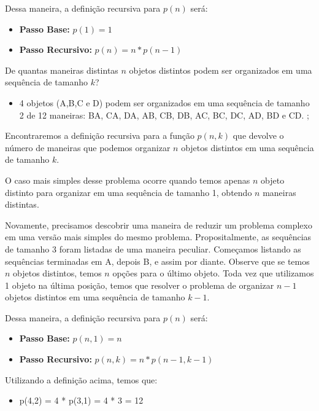 Dessa maneira, a definição recursiva para $p(n)$ será:

\begin{itemize}
    \item \textbf{Passo Base:} $p(1) = 1$
    \item \textbf{Passo Recursivo:} $p(n) = n * p(n-1)$
\end{itemize}


\begin{exemplo}
De quantas maneiras distintas $n$ objetos distintos podem ser organizados em uma sequência de tamanho $k$?


\begin{itemize}
    \item 4 objetos (A,B,C e D) podem ser organizados em uma sequência de tamanho 2 de  12 maneiras: BA, CA, DA, AB, CB, DB, AC, BC, DC, AD, BD e CD. 
    ;
\end{itemize}

\end{exemplo}


Encontraremos a definição recursiva para a função $p(n,k)$ que devolve o número de maneiras que podemos organizar $n$ objetos distintos em uma sequência de tamanho $k$.


O caso mais simples desse problema ocorre quando temos apenas $n$ objeto distinto para organizar em uma sequência de tamanho 1, obtendo $n$ maneiras distintas. 

Novamente, precisamos descobrir uma maneira de reduzir um problema complexo em uma versão mais simples do mesmo problema. Propositalmente, as sequências de tamanho 3 foram listadas de uma maneira peculiar. Começamos listando as sequências terminadas em A, depois B, e assim por diante. Observe que se temos $n$ objetos distintos, temos $n$ opções para o último objeto. Toda vez que utilizamos 1 objeto na última posição, temos que resolver o problema de organizar $n-1$ objetos distintos em uma sequência de tamanho $k-1$.


Dessa maneira, a definição recursiva para $p(n)$ será:

\begin{itemize}
    \item \textbf{Passo Base:} $p(n, 1) = n$
    \item \textbf{Passo Recursivo:} $p(n,k) = n * p(n-1, k-1)$
\end{itemize}

Utilizando a definição acima, temos que:

\begin{itemize}
    \item p(4,2) = 4 * p(3,1) = 4 * 3 = 12
\end{itemize}


